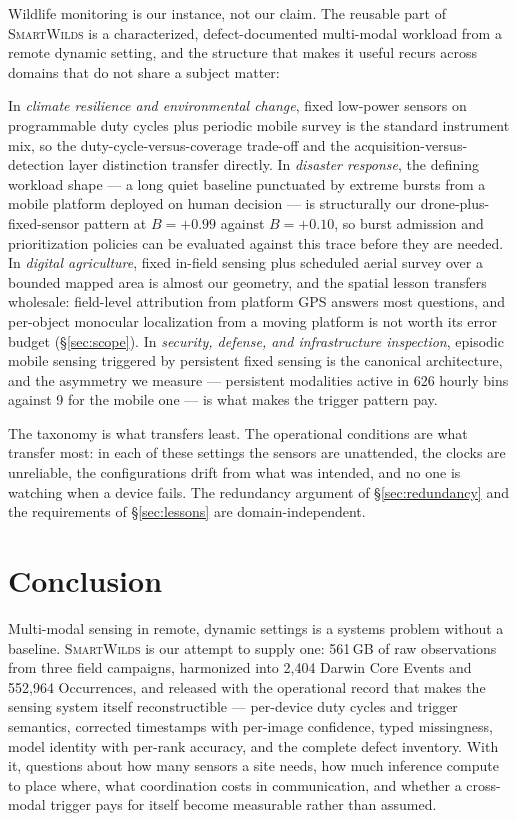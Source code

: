 \documentclass[sigconf]{acmart}
\newcommand{\smartwilds}{\textsc{SmartWilds}\xspace}
\begin{document}
Wildlife monitoring is our instance, not our claim. The reusable part of
\smartwilds is a characterized, defect-documented multi-modal workload
from a remote dynamic setting, and the structure that makes it useful
recurs across domains that do not share a subject matter:

In \emph{climate resilience and environmental change}, fixed low-power
sensors on programmable duty cycles plus periodic mobile survey is the
standard instrument mix, so the duty-cycle-versus-coverage trade-off and
the acquisition-versus-detection layer distinction transfer directly.
In \emph{disaster response}, the defining workload shape --- a long
quiet baseline punctuated by extreme bursts from a mobile platform
deployed on human decision --- is structurally our drone-plus-fixed-sensor
pattern at $B{=}+0.99$ against $B{=}+0.10$, so burst admission and
prioritization policies can be evaluated against this trace before they
are needed. In \emph{digital agriculture}, fixed in-field sensing plus
scheduled aerial survey over a bounded mapped area is almost our
geometry, and the spatial lesson transfers wholesale: field-level
attribution from platform GPS answers most questions, and per-object
monocular localization from a moving platform is not worth its error
budget (\S\ref{sec:scope}). In \emph{security, defense, and
infrastructure inspection}, episodic mobile sensing triggered by
persistent fixed sensing is the canonical architecture, and the
asymmetry we measure --- persistent modalities active in 626 hourly bins
against 9 for the mobile one --- is what makes the trigger pattern pay.

The taxonomy is what transfers least. The operational conditions are
what transfer most: in each of these settings the sensors are
unattended, the clocks are unreliable, the configurations drift from
what was intended, and no one is watching when a device fails. The
redundancy argument of \S\ref{sec:redundancy} and the requirements of
\S\ref{sec:lessons} are domain-independent.

\section{Conclusion}
\label{sec:conclusion}

Multi-modal sensing in remote, dynamic settings is a systems problem
without a baseline. \smartwilds is our attempt to supply one: 561\,GB of
raw observations from three field campaigns, harmonized into
2{,}404 Darwin Core Events and 552{,}964 Occurrences, and released with
the operational record that makes the sensing system itself
reconstructible --- per-device duty cycles and trigger semantics,
corrected timestamps with per-image confidence, typed missingness, model
identity with per-rank accuracy, and the complete defect inventory.
With it, questions about how many sensors a site needs, how much
inference compute to place where, what coordination costs in
communication, and whether a cross-modal trigger pays for itself become
measurable rather than assumed.
\end{document}
